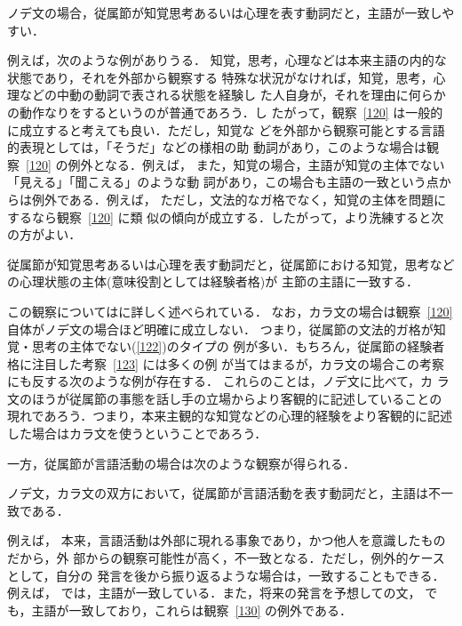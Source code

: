 \begin{obs}\label{120}
ノデ文の場合，従属節が知覚思考あるいは心理を表す動詞だと，主語が一致しやすい．
\end{obs}
例えば，次のような例がありうる．
知覚，思考，心理などは本来主語の内的な状態であり，それを外部から観察する
特殊な状況がなければ，知覚，思考，心理などの中動の動詞で表される状態を経験し
た人自身が，それを理由に何らかの動作なりをするというのが普通であろう．し
たがって，観察~\ref{120} は一般的に成立すると考えても良い．ただし，知覚な
どを外部から観察可能とする言語的表現としては，「そうだ」などの様相の助
動詞があり，このような場合は観察~\ref{120} の例外となる．例えば，
また，知覚の場合，主語が知覚の主体でない「見える」「聞こえる」のような動
詞があり，この場合も主語の一致という点からは例外である．例えば，
ただし，文法的なガ格でなく，知覚の主体を問題にするなら観察~\ref{120} に類
似の傾向が成立する．したがって，より洗練すると次の方がよい．
\begin{kousatu}\label{123}
従属節が知覚思考あるいは心理を表す動詞だと，従属節における知覚，思考など
の心理状態の主体{\rm (}意味役割としては経験者格{\rm )}が
主節の主語に一致する．
\end{kousatu}
この観察については\cite{中川ので95}に詳しく述べられている．
なお，カラ文の場合は観察~\ref{120} 自体がノデ文の場合ほど明確に成立しない．
つまり，従属節の文法的ガ格が知覚・思考の主体でない(\ref{122})のタイプの
例が多い．もちろん，従属節の経験者格に注目した考察~\ref{123} には多くの例
が当てはまるが，カラ文の場合この考察にも反する次のような例が存在する．
これらのことは，ノデ文に比べて，カ
ラ文のほうが従属節の事態を話し手の立場からより客観的に記述していることの
現れであろう．つまり，本来主観的な知覚などの心理的経験をより客観的に記述
した場合はカラ文を使うということであろう．

一方，従属節が言語活動の場合は次のような観察が得られる．

\begin{obs}\label{130}
ノデ文，カラ文の双方において，従属節が言語活動を表す動詞だと，主語は不一
致である．
\end{obs}
例えば，
本来，言語活動は外部に現れる事象であり，かつ他人を意識したものだから，外
部からの観察可能性が高く，不一致となる．ただし，例外的ケースとして，自分の
発言を後から振り返るような場合は，一致することもできる．例えば，
では，主語が一致している．また，将来の発言を予想しての文，
でも，主語が一致しており，これらは観察~\ref{130} の例外である．

